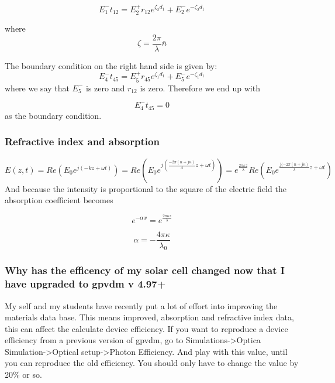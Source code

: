 \documentclass[11pt]{article}
\begin{document}
\begin{equation}
E_{1}^{-}t_{12}=E_{2}^{+}r_{12}e^{\zeta_2 d_1}+E_{2}^{-}e^{-\zeta_2 d_1}
\end{equation}

where
\begin{equation}
\zeta=\frac{2\pi}{\lambda} \bar{n}
\end{equation}



The boundary condition on the right hand side is given by:
\begin{equation}
E_{4}^{-}t_{45}=E_{5}^{+}r_{45}e^{\zeta_1 d_1}+E_{5}^{-}e^{-\zeta_1 d_1}
\end{equation}
where we say that $E_{5}^{-}$ is zero and $r_{12}$ is zero.  Therefore we end up with

\begin{equation}
E_{4}^{-}t_{45}=0
\end{equation}
as the boundary condition.

\subsubsection{Refractive index and absorption}
\begin{equation}
E(z,t)=Re(E_0 e^{j(-kz+\omega t)})= Re(E_0 e^{j(\frac{-2 \pi (n+j\kappa)}{\lambda}z + \omega t)})=e^{\frac{2\pi\kappa z}{\lambda}}Re(E_0 e^{\frac{j(-2 \pi (n+j\kappa)}{\lambda}z +\omega t})
\end{equation}
And because the intensity is proportional to the square of the electric field the absorption coefficient becomes

\begin{equation}
e^{-\alpha x}=e^{\frac{2\pi\kappa z}{\lambda}}
\end{equation}

\begin{equation}
\alpha=-\frac{4\pi\kappa}{\lambda_0}
\end{equation}

\subsubsection{Why has the efficency of my solar cell changed now that I have upgraded to gpvdm v 4.97+}
My self and my students have recently put a lot of effort into improving the materials data base.  This means improved, absorption and refractive index data, this can affect the calculate device efficiency.  If you want to reproduce a device efficiency from a previous version of gpvdm, go to Simulations->Optica Simulation->Optical setup->Photon Efficiency. And play with this value, until you can reproduce the old efficiency.  You should only have to change the value by 20\% or so.
\end{document}
